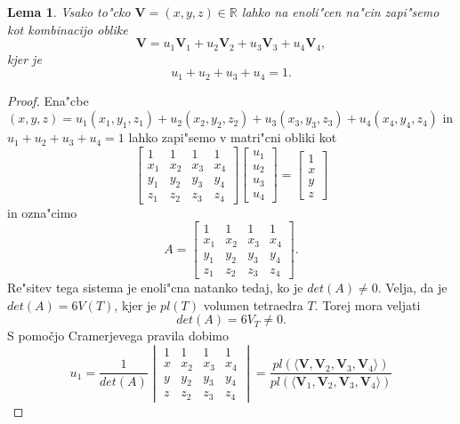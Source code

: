 \documentclass[12pt,a4paper]{amsart}
\theoremstyle{definition} %
\theoremstyle{plain} %
\newtheorem{lemma}[theorem]{Lema}
\begin{document}
\begin{lemma}
Vsako to"cko $\textbf{V} = (x, y, z) \in \mathbb{R}$  lahko na enoli"cen na"cin zapi"semo kot kombinacijo oblike
\begin{equation*}
\textbf{V} = u_{1}\textbf{V}_{1} + u_{2}\textbf{V}_{2} + u_{3}\textbf{V}_{3} + u_{4}\textbf{V}_{4},
\end{equation*}
kjer je
$$
u_{1} + u_{2} + u_{3} + u_{4} = 1.
$$
\end{lemma}
\begin{proof}
Ena"cbe $(x, y, z) = u_{1}(x_{1}, y_{1}, z_{1}) + u_{2}(x_{2}, y_{2}, z_{2}) + u_{3}(x_{3}, y_{3}, z_{3}) + u_{4}(x_{4}, y_{4}, z_{4}) $ in $u_{1} + u_{2} + u_{3} + u_{4} = 1$ lahko zapi"semo v matri"cni obliki kot
$$
\begin{bmatrix}
  1 & 1 & 1 & 1\\ 
  x_{1} & x_{2} & x_{3} & x_{4}\\
  y_{1} & y_{2} & y_{3} & y_{4}\\
  z_{1} & z_{2} & z_{3} & z_{4}
\end{bmatrix}
\begin{bmatrix}
u_{1}\\
u_{2}\\
u_{3}\\
u_{4}
\end{bmatrix}
=
\begin{bmatrix}
1\\
x\\
y\\
z
\end{bmatrix}
$$
in ozna"cimo
$$
A = \begin{bmatrix}
  1 & 1 & 1 & 1\\ 
  x_{1} & x_{2} & x_{3} & x_{4}\\
  y_{1} & y_{2} & y_{3} & y_{4}\\
  z_{1} & z_{2} & z_{3} & z_{4}
\end{bmatrix}.
$$
Re"sitev tega sistema je enoli"cna natanko tedaj, ko je $det(A) \neq 0$. Velja, da je $det(A) = 6V(T)$, kjer je $pl(T)$ volumen tetraedra $T$. Torej mora veljati
$$
det(A) = 6V_{T} \neq 0.
$$
S pomočjo Cramerjevega pravila dobimo
$$
u_{1} = \frac{1}{det(A)}
\begin{vmatrix}
  1 & 1 & 1 & 1\\ 
  x & x_{2} & x_{3} & x_{4}\\
  y & y_{2} & y_{3} & y_{4}\\
  z & z_{2} & z_{3} & z_{4}
\end{vmatrix}
=
\frac{pl(\langle\textbf{V}, \textbf{V}_{2}, \textbf{V}_{3}, \textbf{V}_{4}\rangle)}{pl(\langle\textbf{V}_{1}, \textbf{V}_{2}, \textbf{V}_{3}, \textbf{V}_{4}\rangle)}
$$
\end{proof}
\end{document}
